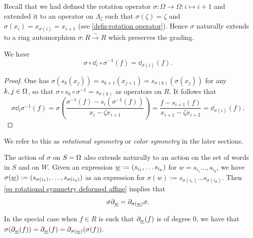 Recall that we had defined the rotation operator $\sigma: \Omega \rightarrow \Omega: i \mapsto i+1$  and extended it to an operator on $\Lambda_{\zeta}$ such that $\sigma(\zeta)=\zeta$ and $\sigma(x_i)=x_{\sigma(i)}=x_{i+1}$ (see \cref{defn-rotation operator}). Hence $\sigma$ naturally extends to a ring automorphism $\sigma: R\xrightarrow{\sim} R$ which preserves the grading.

\begin{lemma} We have
\begin{equation} \label{eq rotational symmetry deformed affine} \sigma \circ \dd_i \circ \sigma^{-1} (f) = \dd_{\sigma(i)}(f). \end{equation}
\end{lemma}

\begin{proof} One has $\sigma(s_{k}(x_{j}))=s_{k+1}(x_{j+1})=s_{\sigma(k)}(\sigma(x_j))$ for any $k, j\in \Omega$, so that $\sigma\circ s_k \circ \sigma^{-1}=s_{\sigma(k)}$ as operators on $R$.
It follows that
\[ \sigma\dd_i \sigma^{-1}(f)=\sigma \left(\frac{\sigma^{-1}(f)-s_i(\sigma^{-1}(f))}{x_i-\zeta x_{i+1}} \right)
=\frac{f-s_{i+1}(f)}{x_{i+1}-\zeta x_{i+2}}=\dd_{\sigma(i)} (f). \]
\end{proof}
We refer to this as \emph{rotational symmetry} or \emph{color symmetry} in the later sections.

The action of $\sigma$ on $S=\Omega$ also extends naturally to an action on the set of words in $S$ and on $W$. 
Given an expression $\underline{w}:=(s_{i_1}, \ldots s_{i_k})$ for $w=s_{i_1}\ldots ,s_{i_d}$, we have $\sigma(\underline{w}):=(s_{\sigma(i_1)}, \ldots ,s_{\sigma(i_d)})$ as an expression for $\sigma(w):=s_{\sigma(i_1)}\ldots s_{\sigma(i_d)}$. 
Then \cref{eq rotational symmetry deformed affine} implies that 
\begin{equation}
    \sigma\partial_{\underline{w}}=\partial_{\sigma(\underline{w})}\sigma.
\end{equation}


\begin{remark}\label{rmk symmetry for rotation operator}
    In the special case when $f \in R$ is such that $\partial_{\underline{w}}(f)$ is of degree 0, we have that $\sigma(\partial_{\underline{w}}(f))=\partial_{\underline{w}}(f)=\partial_{\sigma(\underline{w})}(\sigma(f)).$
\end{remark}

